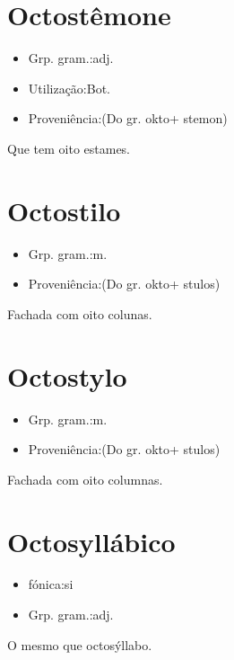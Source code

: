 \section{Octostêmone}
\begin{itemize}
\item {Grp. gram.:adj.}
\end{itemize}
\begin{itemize}
\item {Utilização:Bot.}
\end{itemize}
\begin{itemize}
\item {Proveniência:(Do gr. \textunderscore okto\textunderscore  + \textunderscore stemon\textunderscore )}
\end{itemize}
Que tem oito estames.
\section{Octostilo}
\begin{itemize}
\item {Grp. gram.:m.}
\end{itemize}
\begin{itemize}
\item {Proveniência:(Do gr. \textunderscore okto\textunderscore  + \textunderscore stulos\textunderscore )}
\end{itemize}
Fachada com oito colunas.
\section{Octostylo}
\begin{itemize}
\item {Grp. gram.:m.}
\end{itemize}
\begin{itemize}
\item {Proveniência:(Do gr. \textunderscore okto\textunderscore  + \textunderscore stulos\textunderscore )}
\end{itemize}
Fachada com oito columnas.
\section{Octosyllábico}
\begin{itemize}
\item {fónica:si}
\end{itemize}
\begin{itemize}
\item {Grp. gram.:adj.}
\end{itemize}
O mesmo que \textunderscore octosýllabo\textunderscore .
